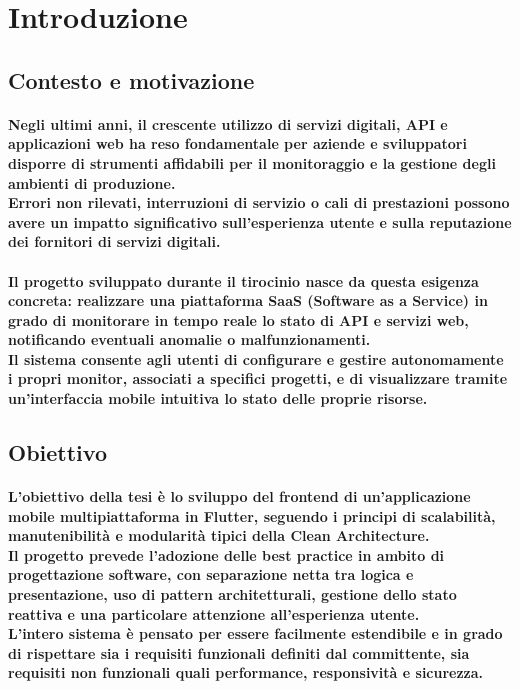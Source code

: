 \section{\textbf{Introduzione}}

\subsection{Contesto e motivazione}

\paragraph{Negli ultimi anni, il crescente utilizzo di servizi digitali, 
API e applicazioni web ha reso fondamentale per aziende e sviluppatori disporre di strumenti 
affidabili per il monitoraggio e la gestione degli ambienti di produzione.
\\Errori non rilevati, interruzioni di servizio o cali di prestazioni possono avere un impatto 
significativo sull’esperienza utente e sulla reputazione dei fornitori di servizi digitali.}
\paragraph{Il progetto sviluppato durante il tirocinio nasce da questa esigenza concreta: 
realizzare una piattaforma SaaS (Software as a Service) in grado di monitorare in tempo reale 
lo stato di API e servizi web, notificando eventuali anomalie o malfunzionamenti.
\\Il sistema consente agli utenti di configurare e gestire autonomamente i propri monitor, 
associati a specifici progetti, e di visualizzare tramite un'interfaccia mobile intuitiva 
lo stato delle proprie risorse.}

\subsection{Obiettivo}

\paragraph{L’obiettivo della tesi è lo sviluppo del frontend di un’applicazione mobile multipiattaforma 
in Flutter, seguendo i principi di scalabilità, 
manutenibilità e modularità tipici della Clean Architecture.
\\Il progetto prevede l’adozione delle best practice in ambito di progettazione software, 
con separazione netta tra logica e presentazione, uso di pattern architetturali, 
gestione dello stato reattiva e una particolare attenzione all’esperienza utente.
\\L’intero sistema è pensato per essere facilmente estendibile e in grado di 
rispettare sia i requisiti funzionali definiti dal committente, sia requisiti 
non funzionali quali performance, responsività e sicurezza.}

